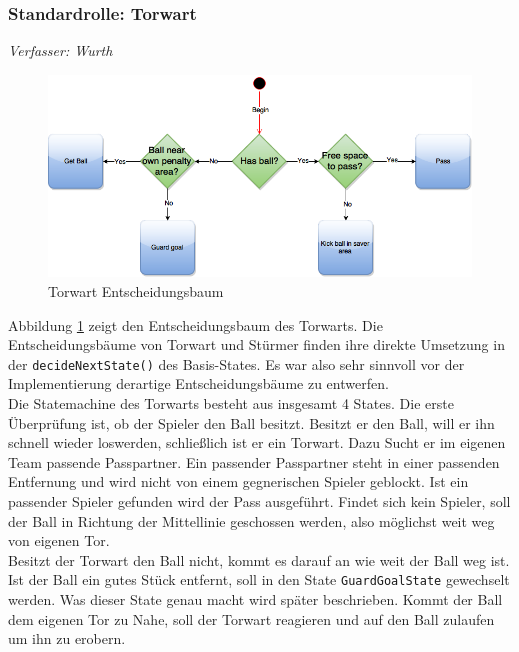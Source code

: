 \documentclass[fontsize=12pt,a4paper,final]{scrartcl}[2003/01/01]
\makeatletter
\def\ScaleIfNeeded{%
	\ifdim\Gin@nat@width>\linewidth
		\linewidth
	\else
		\Gin@nat@width
	\fi
}
\makeatother
\begin{document}
\subsubsection{Standardrolle: Torwart}
\textit{Verfasser: Wurth}\\

\begin{figure}[H]
	\centering
	\includegraphics[width=\ScaleIfNeeded]{Grafiken/KI/Keeper}
	\caption{Torwart Entscheidungsbaum}
	\label{Torwart Entscheidungsbaum}
\end{figure}

Abbildung \ref{Torwart Entscheidungsbaum} zeigt den Entscheidungsbaum des Torwarts. Die Entscheidungsbäume von Torwart und Stürmer finden ihre direkte Umsetzung in der \lstinline$decideNextState()$ des Basis-States. Es war also sehr sinnvoll vor der Implementierung derartige Entscheidungsbäume zu entwerfen.
\\

Die Statemachine des Torwarts besteht aus insgesamt 4 States. Die erste Überprüfung ist, ob der Spieler den Ball besitzt. Besitzt er den Ball, will er ihn schnell wieder loswerden, schließlich ist er ein Torwart. Dazu Sucht er im eigenen Team passende Passpartner. Ein passender Passpartner steht in einer passenden Entfernung und wird nicht von einem gegnerischen Spieler geblockt. Ist ein passender Spieler gefunden wird der Pass ausgeführt. Findet sich kein Spieler, soll der Ball in Richtung der Mittellinie geschossen werden, also möglichst weit weg von eigenen Tor.
\\

Besitzt der Torwart den Ball nicht, kommt es darauf an wie weit der Ball weg ist. Ist der Ball ein gutes Stück entfernt, soll in den State \lstinline$GuardGoalState$ gewechselt werden. Was dieser State genau macht wird später beschrieben. Kommt der Ball dem eigenen Tor zu Nahe, soll der Torwart reagieren und auf den Ball zulaufen um ihn zu erobern.
\\
\end{document}
